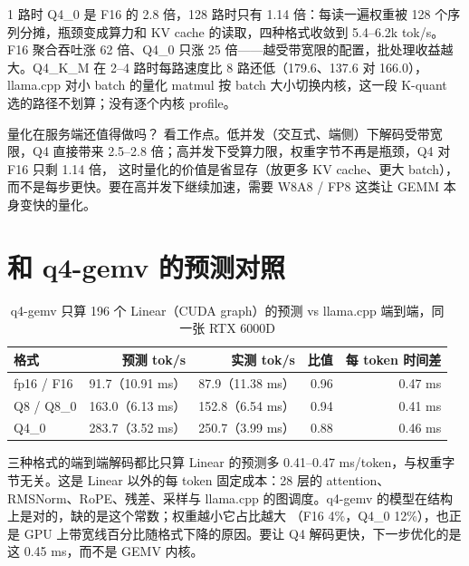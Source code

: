 \documentclass[11pt,a4paper]{ctexart}
\begin{document}
1 路时 Q4\_0 是 F16 的 2.8 倍，128 路时只有 1.14 倍：每读一遍权重被 128 个序列分摊，瓶颈变成算力和 KV cache 的读取，四种格式收敛到 5.4--6.2k tok/s。
F16 聚合吞吐涨 62 倍、Q4\_0 只涨 25 倍——越受带宽限的配置，批处理收益越大。Q4\_K\_M 在 2--4 路时每路速度比 8 路还低（179.6、137.6 对 166.0），
llama.cpp 对小 batch 的量化 matmul 按 batch 大小切换内核，这一段 K-quant 选的路径不划算；没有逐个内核 profile。

\begin{iqbox}{量化在服务端还值得做吗？}
看工作点。低并发（交互式、端侧）下解码受带宽限，Q4 直接带来 2.5--2.8 倍；高并发下受算力限，权重字节不再是瓶颈，Q4 对 F16 只剩 1.14 倍，
这时量化的价值是省显存（放更多 KV cache、更大 batch），而不是每步更快。要在高并发下继续加速，需要 W8A8 / FP8 这类让 GEMM 本身变快的量化。
\end{iqbox}

\section{和 q4-gemv 的预测对照}\label{sec:pred}

\begin{table}[H]
\centering\small
\caption{q4-gemv 只算 196 个 Linear（CUDA graph）的预测 vs llama.cpp 端到端，同一张 RTX 6000D}\label{tab:pred}
\begin{tabular}{lrrrr}
\toprule
格式 & 预测 tok/s & 实测 tok/s & 比值 & 每 token 时间差 \\
\midrule
fp16 / F16 & 91.7（10.91 ms） & 87.9（11.38 ms） & 0.96 & 0.47 ms \\
Q8 / Q8\_0 & 163.0（6.13 ms） & 152.8（6.54 ms） & 0.94 & 0.41 ms \\
Q4\_0 & 283.7（3.52 ms） & 250.7（3.99 ms） & 0.88 & 0.46 ms \\
\bottomrule
\end{tabular}
\end{table}

\begin{findingbox}[：层时间之和只差一个常数项]
三种格式的端到端解码都比只算 Linear 的预测多 0.41--0.47 ms/token，与权重字节无关。这是 Linear 以外的每 token 固定成本：28 层的 attention、
RMSNorm、RoPE、残差、采样与 llama.cpp 的图调度。q4-gemv 的模型在结构上是对的，缺的是这个常数；权重越小它占比越大
（F16 4\%，Q4\_0 12\%），也正是 GPU 上带宽线百分比随格式下降的原因。要让 Q4 解码更快，下一步优化的是这 0.45 ms，而不是 GEMV 内核。
\end{findingbox}
\end{document}
